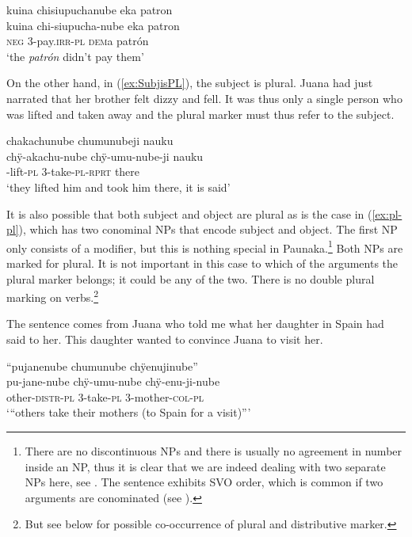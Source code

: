 \ea\label{ex:3sg-3pl-2}
\begingl 
\glpreamble kuina chisiupuchanube eka patron\\
\gla kuina chi-siupucha-nube eka patron\\ 
\glb \textsc{neg} 3-pay.\textsc{irr}-\textsc{pl} \textsc{dem}a patrón\\ 
\glft ‘the \textit{patrón} didn’t pay them’
\trailingcitation{[mxx-p110825l.042]}
\xe

On the other hand, in (\ref{ex:SubjisPL}), the subject is plural. Juana had just narrated that her brother felt dizzy and fell. It was thus only a single person who was lifted and taken away and the plural marker must thus refer to the subject. %

\ea\label{ex:SubjisPL}
\begingl
\glpreamble chakachunube chumunubeji nauku\\
\gla chÿ-akachu-nube chÿ-umu-nube-ji nauku\\
-lift-\textsc{pl} 3-take-\textsc{pl}-\textsc{rprt} there\\
\glft ‘they lifted him and took him there, it is said’
\endgl
\trailingcitation{[jxx-p120430l-2.444]}
\xe

It is also possible that both subject and object are plural as is the case in (\ref{ex:pl-pl}), which has two conominal NPs that encode subject and object. The first NP only consists of a modifier, but this is nothing special in Paunaka.\footnote{There are no discontinuous NPs and there is usually no agreement in number inside an NP, thus it is clear that we are indeed dealing with two separate NPs here, see . The sentence exhibits SVO order, which is common if two arguments are conominated (see ).}  Both NPs are marked for plural. It is not important in this case to which of the arguments the plural marker belongs; it could be any of the two. There is no double plural marking on verbs.\footnote{But see below for possible co-occurrence of plural and distributive marker.}

The sentence comes from Juana who told me what her daughter in Spain had said to her. This daughter wanted to convince Juana to visit her.

\ea\label{ex:pl-pl}
\begingl 
\glpreamble “pujanenube chumunube chÿenujinube”\\
\gla pu-jane-nube chÿ-umu-nube chÿ-enu-ji-nube\\ 
\glb other-\textsc{distr}-\textsc{pl} 3-take-\textsc{pl} 3-mother-\textsc{col}-\textsc{pl}\\ 
\glft ‘“others take their mothers (to Spain for a visit)”’
\trailingcitation{[jxx-e120516l-1.030]}
\xe
{}


